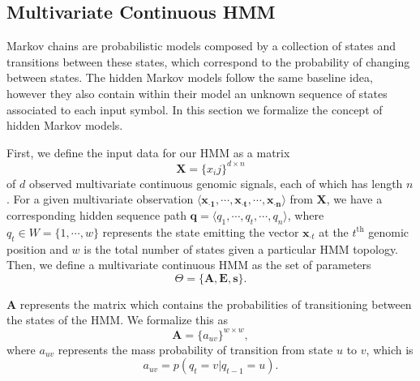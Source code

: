 \subsection{Multivariate Continuous HMM}
\label{sec:multivariate.continuous.hmm}

Markov chains are probabilistic models composed by a collection of states and transitions between these states, which correspond to the probability of changing between states. The hidden Markov models follow the same baseline idea, however they also contain within their model an unknown sequence of states associated to each input symbol. In this section we formalize the concept of hidden Markov models.

First, we define the input data for our HMM as a matrix
\begin{equation}
  \label{eq:hmm.input.data}
  \mathbf{X} = \{x_ij\}^{d \times n}
\end{equation}
of $d$ observed multivariate continuous genomic signals, each of which has length $n$. For a given multivariate observation $\langle \mathbf{{x}_{\cdot 1}}, \cdots, \mathbf{{x}_{\cdot t}}, \cdots, \mathbf{{x}_{\cdot n}} \rangle$ from $\mathbf{X}$, we have a corresponding hidden sequence path $\mathbf{q} = \langle q_1, \cdots, q_t, \cdots, q_n \rangle$, where $ q_t \in W = \{1, \cdots, w\} $ represents the state emitting the vector $ {\mathbf{x}}_{\cdot t} $ at the $t^{\text{th}}$ genomic position and $w$ is the total number of states given a particular HMM topology. Then, we define a multivariate continuous HMM as the set of parameters
\begin{equation}
  \label{eq:hmm.theta}
  \Theta= \{\mathbf{A}, \mathbf{E}, \mathbf{s}\}.
\end{equation}

$\mathbf{A}$ represents the matrix which contains the probabilities of transitioning between the states of the HMM. We formalize this as
\begin{equation}
  \label{eq:hmm.a}
  \mathbf{A} = {\{a_{uv}\}}^{w \times w},
\end{equation}
where $a_{uv}$ represents the mass probability of transition from state $u$ to $v$, which is
\begin{equation}
  \label{eq:hmm.transition}
  a_{uv} = p(q_t = v | q_{t-1} = u).
\end{equation}

